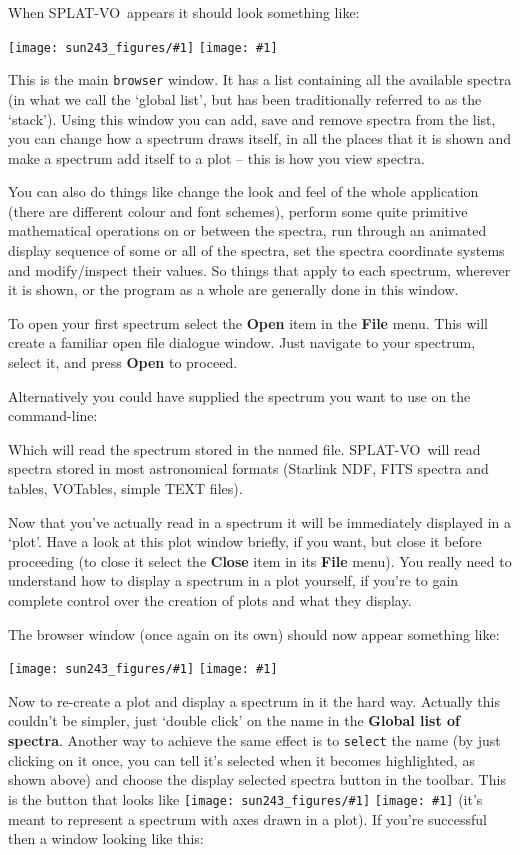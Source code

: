 \documentclass[twoside,11pt,nolof]{starlink}
\providecommand{\SPLAT}{\textsf{SPLAT-VO}}
\providecommand{\mainfigure}[1]
{\begin{center}
    \ifpdf
    \texttt{[image: sun243\_figures/\#1]}
    \else
    \texttt{[image: \#1]}
    \fi
 \end{center}
}
\providecommand{\inline}[1]
        {\ifpdf
          \texttt{[image: sun243\_figures/\#1]}
          \else
          \texttt{[image: \#1]}
          \fi
        }
\renewcommand{\menuitem}[1]{\textbf{#1}}
\newcommand{\labelitem}[1]{\textbf{#1}}
\providecommand{\hitext}[1]{\texttt{#1}}
\begin{document}
When \SPLAT\ appears it should look something like:

\mainfigure{browser1}

This is the main \hitext{browser} window. It has a list containing all
the available spectra (in what we call the `global list', but has been
traditionally referred to as the `stack'). Using this window you can
add, save and remove spectra from the list, you can change how a
spectrum draws itself, in all the places that it is shown and make a
spectrum add itself to a plot -- this is how you view spectra.

You can also do things like change the look and feel of the whole
application (there are different colour and font schemes), perform
some quite primitive mathematical operations on or between the
spectra, run through an animated display sequence of some or all of the
spectra, set the spectra coordinate systems and modify/inspect their
values. So things that apply to each spectrum, wherever it is shown,
or the program as a whole are generally done in this window.

To open your first spectrum select the \menuitem{Open} item in the
\menuitem{File} menu. This will create a familiar open file dialogue
window. Just navigate to your spectrum, select it, and press
\menuitem{Open} to proceed.

Alternatively you could have supplied the spectrum you want to use on
the command-line:
\begin{quote}
\begin{terminalv}
\end{terminalv}
\end{quote}
Which will read the spectrum stored in the named file. \SPLAT\ will read
spectra stored in most astronomical formats (Starlink NDF, FITS spectra and
tables, VOTables, simple TEXT files).

Now that you've actually read in a spectrum it will be immediately
displayed in a `plot'. Have a look at this plot window briefly, if you
want, but close it before proceeding (to close it select the
\menuitem{Close} item in its \menuitem{File} menu). You really need to
understand how to display a spectrum in a plot yourself, if you're to
gain complete control over the creation of plots and what they
display.

The browser window (once again on its own) should now appear something
like:

\mainfigure{browser2}

Now to re-create a plot and display a spectrum in it the hard
way. Actually this couldn't be simpler, just `double click' on the
name in the \labelitem{Global list of spectra}. Another way to achieve
the same effect is to \hitext{select} the name (by just clicking on it
once, you can tell it's selected when it becomes highlighted, as shown
above) and choose the display selected spectra button in the
toolbar. This is the button that looks like \inline{display} (it's
meant to represent a spectrum with axes drawn in a plot). If you're
successful then a window looking like this:
\end{document}
